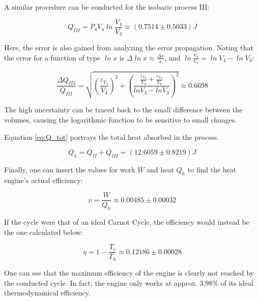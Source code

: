 A similar procedure can be conducted for the isobaric process III:

\begin{equation}
\label{eq:T const}
    \mathit{Q_{III} = P_4 V_4 \ln{\frac{V_4}{V_3}} \approx (0.7514 \pm 0.5033) J}
\end{equation}

Here, the error is also gained from analyzing the error propagation. Noting that the error for a function of type $\mathit{\ln{x}}$ is $\mathit{\Delta \ln{x} \approx \frac{\Delta x}{x}}$, and $\mathit{\ln{\frac{V_4}{V_3}} = \ln{V_4} - \ln{V_3}}$: 

\begin{equation}
    \label{eq:Q_III_Error}
    \mathit{\frac{\Delta Q_{III}}{Q_{III}} = \sqrt{(\frac{\varepsilon_{V_4}}{V_4})^2 + (\frac{\frac{\varepsilon_{V_4}}{V_4} + \frac{\varepsilon_{V_3}}{V_3}}{lnV_4-lnV_3})^2} \approx 0.6698}
\end{equation}

The high uncertainty can be traced back to the small difference between the volumes, causing the logarithmic function to be sensitive to small changes.

Equation \ref{eq:Q_tot} portrays the total heat absorbed in the process.

\begin{equation}
\label{eq:Q_tot}
    \mathit{Q_{h} = Q_{II} + Q_{III} = (12.6059 \pm 0.8219) J}
\end{equation}

Finally, one can insert the values for work $\mathit{W}$ and heat $\mathit{Q_h}$ to find the heat engine's actual efficiency:

\begin{equation}
\label{eq:Exp_Efficiency}
    \mathit{\nu = \frac{W}{Q_h} \approx 0.00485 \pm 0.00032}
\end{equation}

If the cycle were that of an ideal Carnot Cycle, the efficiency would instead be the one calculated below:

\begin{equation}
\label{eq:Exp_Carnot_Efficiency}
    \mathit{\eta =  1-\frac{T_c}{T_h} \approx 0.12186 \pm 0.00028}
\end{equation}

One can see that the maximum efficiency of the engine is clearly not reached by the conducted cycle. In fact, the engine only works at approx. $\mathit{3.98 \%}$ of its ideal thermodynamical efficiency.